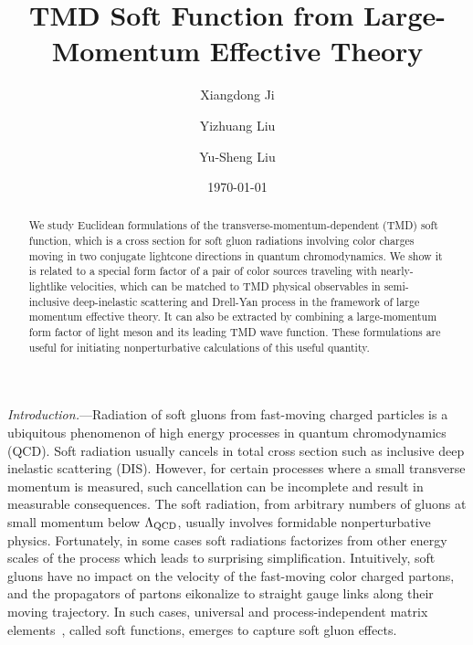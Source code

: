\documentclass[twocolumn,aps,preprintnumbers,prd,superscriptaddress,10pt]{revtex4-1}
\begin{document}
\title{TMD Soft Function from Large-Momentum Effective Theory}

\author{Xiangdong Ji}

\author{Yizhuang Liu}

\author{Yu-Sheng Liu}

\date{\today}

\begin{abstract}
We study Euclidean formulations of the transverse-momentum-dependent (TMD) soft function, which is a cross section for soft gluon
radiations involving color charges moving in two conjugate lightcone directions in quantum chromodynamics.
%
We show it is related to a special form factor of a pair of color sources traveling with nearly-lightlike velocities, which can be matched
to TMD physical observables in semi-inclusive deep-inelastic scattering and Drell-Yan process
in the framework of large momentum effective theory.
%
It can also be extracted by combining a large-momentum form factor of light meson and its leading TMD wave function. These
formulations are useful for initiating nonperturbative calculations of this useful quantity.
\end{abstract}


\maketitle
{\it Introduction.}---Radiation of soft gluons from fast-moving charged particles is a ubiquitous phenomenon of high energy processes in quantum chromodynamics (QCD).
%
Soft radiation usually cancels in total cross section such as inclusive deep inelastic scattering (DIS). However, for certain processes where a small transverse momentum is measured, such cancellation can be incomplete and result in measurable consequences.
%
The soft radiation, from arbitrary numbers of gluons at small momentum below $\Lambda_{\rm QCD}$, usually involves formidable nonperturbative physics.
%
Fortunately, in some cases soft radiations factorizes from other energy scales of the process which leads to surprising simplification. Intuitively, soft gluons have no impact on the velocity of the fast-moving color charged partons, and the propagators of partons eikonalize to straight gauge links along their moving trajectory.
%
In such cases, universal and process-independent matrix elements~\cite{Collins:1981uk,Kidonakis:1998bk,Collins:2004nx,Bauer:2008jx}, called soft functions, emerges to capture soft gluon effects.
\end{document}
